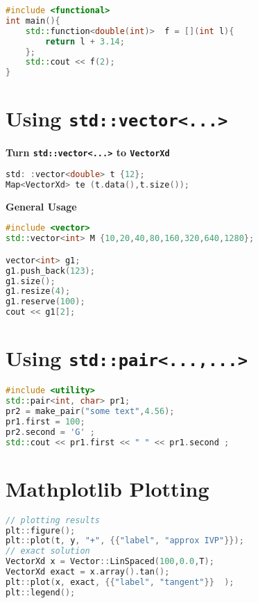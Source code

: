 \documentclass{sciposter}
\newcommand{\psection}[1]{\par \textbf{\large#1}}
\begin{document}
\begin{multicols}{2}
\begin{lstlisting}[language=c++]
#include <functional>
int main(){
	std::function<double(int)>  f = [](int l){
		return l + 3.14;
	};
	std::cout << f(2);
}
\end{lstlisting}





\section*{Using \texttt{std::vector<...>}}


\psection{Turn \texttt{std::vector<...>} to \texttt{VectorXd}}

\begin{lstlisting}[language=c++]
std: :vector<double> t {12};
Map<VectorXd> te (t.data(),t.size());
\end{lstlisting}

\psection{General Usage}

\begin{lstlisting}[language=c++]
#include <vector>
std::vector<int> M {10,20,40,80,160,320,640,1280};

vector<int> g1; 
g1.push_back(123); 
g1.size(); 
g1.resize(4); 
g1.reserve(100);
cout << g1[2];
\end{lstlisting}



\section*{Using \texttt{std::pair<...,...>}}
\begin{lstlisting}[language=c++]
#include <utility>
std::pair<int, char> pr1; 
pr2 = make_pair("some text",4.56); 
pr1.first = 100; 
pr2.second = 'G' ; 
std::cout << pr1.first << " " << pr1.second ; 
\end{lstlisting}





\section*{Mathplotlib Plotting}

\begin{lstlisting}[language=c++]
// plotting results
plt::figure();
plt::plot(t, y, "+", {{"label", "approx IVP"}});
// exact solution 
VectorXd x = Vector::LinSpaced(100,0.0,T);
VectorXd exact = x.array().tan();
plt::plot(x, exact, {{"label", "tangent"}}  );
plt::legend();


\end{lstlisting}
\end{multicols}
\end{document}
